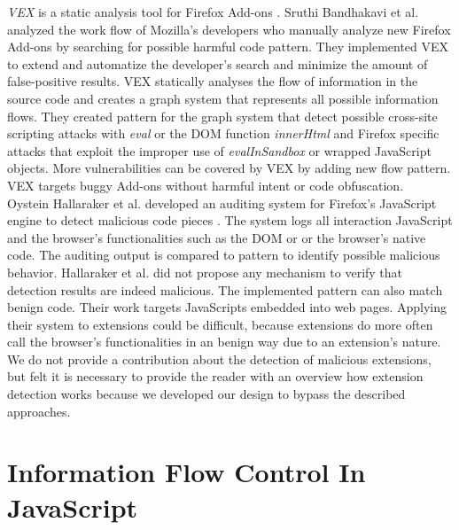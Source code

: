 	\textit{VEX} is a static analysis tool for Firefox Add-ons \cite{Bandhakavi:2011:VBE:1995376.1995398}. Sruthi Bandhakavi et al. analyzed the work flow of Mozilla's developers who manually analyze new Firefox Add-ons by searching for possible harmful code pattern. They implemented VEX to extend and automatize the developer's search and minimize the amount of false-positive results. VEX statically analyses the flow of information in the source code and creates a graph system that represents all possible information flows. They created pattern for the graph system that detect possible cross-site scripting attacks with \textit{eval} or the DOM function \textit{innerHtml} and Firefox specific attacks that exploit the improper use of \textit{evalInSandbox} or wrapped JavaScript objects. More vulnerabilities can be covered by VEX by adding new flow pattern. VEX targets buggy Add-ons without harmful intent or code obfuscation. \\
	
	Oystein Hallaraker et al. developed an auditing system for Firefox's JavaScript engine to detect malicious code pieces \cite{Hallaraker:2005:DMJ:1078029.1078861}. The system logs all interaction JavaScript and the browser's functionalities such as the DOM or or the browser's native code. The auditing output is compared to pattern to identify possible malicious behavior. Hallaraker et al. did not propose any mechanism to verify that detection results are indeed malicious. The implemented pattern can also match benign code. Their work targets JavaScripts embedded into web pages. Applying their system to extensions could be difficult, because extensions do more often call the browser's functionalities in an benign way due to an extension's nature. \\
	
	We do not provide a contribution about the detection of malicious extensions, but felt it is necessary to provide the reader with an overview how extension detection works because we developed our design to bypass the described approaches.

\section{Information Flow Control In JavaScript}
	
